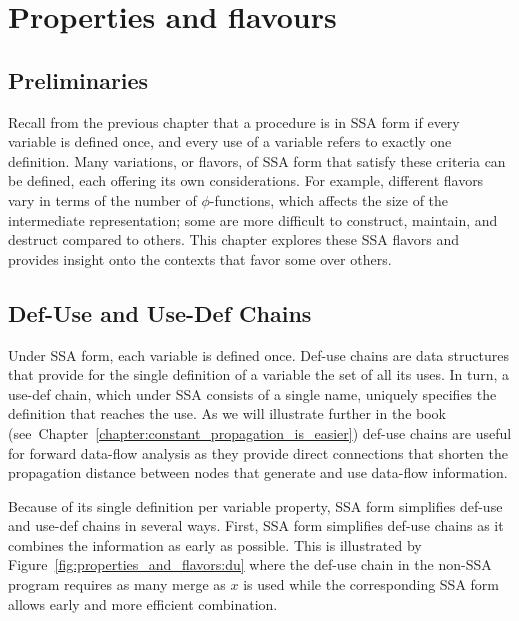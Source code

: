\chapter{Properties and flavours }
\label{chapter:properties_and_flavours}



\section{Preliminaries}

Recall from the previous chapter that a procedure is in SSA form if
every variable is defined once, and every use of a variable refers
to exactly one definition. Many variations, or flavors, of SSA form that 
satisfy these criteria can be defined, each offering its own considerations.
For example, different flavors vary in terms of the number of $\phi$-functions,
which affects the size of the intermediate representation; some are more difficult to construct, maintain, and destruct
compared to others. This chapter explores these SSA flavors and provides
insight onto the contexts that favor some over others. 

\section{Def-Use and Use-Def Chains}
\label{sec:properties_and_flavours:def-use}
Under SSA form, each variable is defined once. Def-use chains are data structures that provide for the single definition of a variable the set of all its uses. In turn, a use-def chain, which under SSA consists of a single name, uniquely specifies the definition that reaches the use. As we will illustrate further in the book (see~Chapter~\ref{chapter:constant_propagation_is_easier}) def-use chains are useful for forward data-flow analysis as they provide direct connections that shorten the propagation distance between nodes that generate and use data-flow information. 

Because of its single definition per variable property, SSA form simplifies def-use and use-def chains in several ways. First, SSA form simplifies def-use chains as it combines the information as early as possible.
This is illustrated by Figure~\ref{fig:properties_and_flavors:du} where the def-use chain in the non-SSA program requires as many merge as $x$ is used while the corresponding SSA form allows early and more efficient combination. 

